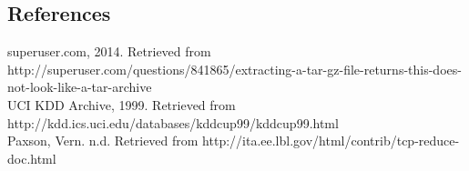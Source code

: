 \documentclass[10pt]{article}
\begin{document}
\subsection*{References}
superuser.com, 2014. Retrieved from http://superuser.com/questions/841865/extracting-a-tar-gz-file-returns-this-does-not-look-like-a-tar-archive\\
UCI KDD Archive, 1999. Retrieved from http://kdd.ics.uci.edu/databases/kddcup99/kddcup99.html\\
Paxson, Vern. n.d. Retrieved from http://ita.ee.lbl.gov/html/contrib/tcp-reduce-doc.html
\end{document}
